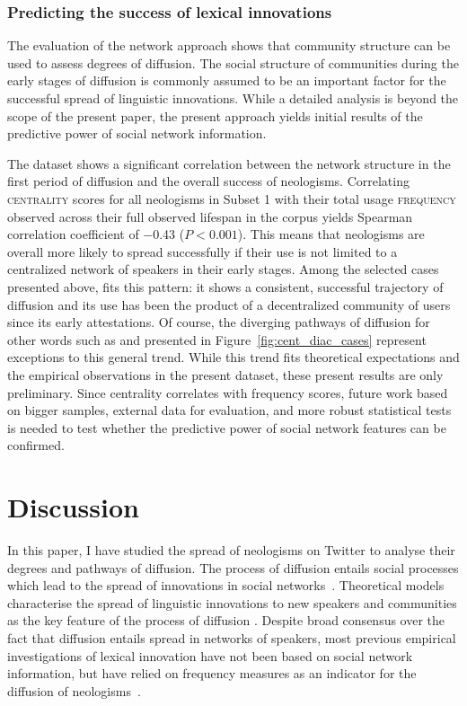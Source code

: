 \documentclass[
  a4paper,
  abstract=on,
  captions=tableabove
  ]{scrartcl}
\begin{document}
    \subsubsection{Predicting the success of lexical innovations}

      The evaluation of the network approach shows that community structure can be used to assess degrees of diffusion. The social structure of communities during the early stages of diffusion is commonly assumed to be an important factor for the successful spread of linguistic innovations. While a detailed analysis is beyond the scope of the present paper, the present approach yields initial results of the predictive power of social network information.

      The dataset shows a significant correlation between the network structure in the first period of diffusion and the overall success of neologisms. Correlating \textsc{centrality} scores for all neologisms in Subset 1 with their total usage \textsc{frequency} observed across their full observed lifespan in the corpus yields Spearman correlation coefficient of \num{-0.43} (${P < 0.001}$). This means that neologisms are overall more likely to spread successfully if their use is not limited to a centralized network of speakers in their early stages. Among the selected cases presented above,  fits this pattern: it shows a consistent, successful trajectory of diffusion and its use has been the product of a decentralized community of users since its early attestations. Of course, the diverging pathways of diffusion for other words such as  and  presented in Figure~\ref{fig:cent_diac_cases} represent exceptions to this general trend. While this trend fits theoretical expectations and the empirical observations in the present dataset, these present results are only preliminary. Since centrality correlates with frequency scores, future work based on bigger samples, external data for evaluation, and more robust statistical tests is needed to test whether the predictive power of social network features can be confirmed.

\section{Discussion}
  \label{sec:discussion}

  In this paper, I have studied the spread of neologisms on Twitter to analyse their degrees and pathways of diffusion. The process of diffusion entails social processes which lead to the spread of innovations in social networks~\parencite{Rogers1962DiffusionInnovations}. Theoretical models characterise the spread of linguistic innovations to new speakers and communities as the key feature of the process of diffusion \parencite{Weinreich1968EmpiricalFoundations,Schmid2020DynamicsLinguistic}. Despite broad consensus over the fact that diffusion entails spread in networks of speakers, most previous empirical investigations of lexical innovation have not been based on social network information, but have relied on frequency measures as an indicator for the diffusion of neologisms~\parencite{Stefanowitsch2017CorpusbasedPerspective}.
\end{document}
